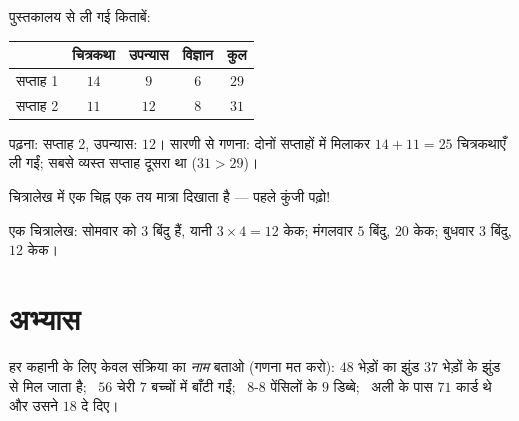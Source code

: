 \begin{example}[एक सारणी]\label{ex:g3:problems:table}
पुस्तकालय से ली गई किताबें:
\begin{center}
\renewcommand{\arraystretch}{1.3}
\begin{tabular}{l|cccc}
 & चित्रकथा & उपन्यास & विज्ञान & कुल \\
\hline
सप्ताह 1 & $14$ & $9$ & $6$ & $29$ \\
सप्ताह 2 & $11$ & $12$ & $8$ & $31$ \\
\end{tabular}
\end{center}
पढ़ना: सप्ताह 2, उपन्यास: $12$। सारणी से गणना: दोनों सप्ताहों
में मिलाकर $14 + 11 = 25$ चित्रकथाएँ ली गईं; सबसे व्यस्त
सप्ताह दूसरा था ($31 > 29$)।
\end{example}

\begin{example}[एक चित्रालेख]\label{ex:g3:problems:pictogram}
चित्रालेख में एक चिह्न एक तय मात्रा दिखाता है --- पहले कुंजी
पढ़ो!

\begin{omfigure}

{\small एक चित्रालेख: सोमवार को $3$ बिंदु हैं, यानी
$3 \times 4 = 12$ केक; मंगलवार $5$ बिंदु, $20$ केक; बुधवार
$3$ बिंदु, $12$ केक।}
\end{omfigure}
\end{example}

\section{अभ्यास}

\begin{exercise}[$\star$]\label{exo:g3:problems:1}
हर कहानी के लिए केवल संक्रिया का \emph{नाम} बताओ (गणना मत करो):
$48$ भेड़ों का झुंड $37$ भेड़ों के झुंड से मिल जाता है; \ $56$
चेरी $7$ बच्चों में बाँटी गईं; \ $8$-$8$ पेंसिलों के $9$ डिब्बे;
\ अली के पास $71$ कार्ड थे और उसने $18$ दे दिए।
\end{exercise}

